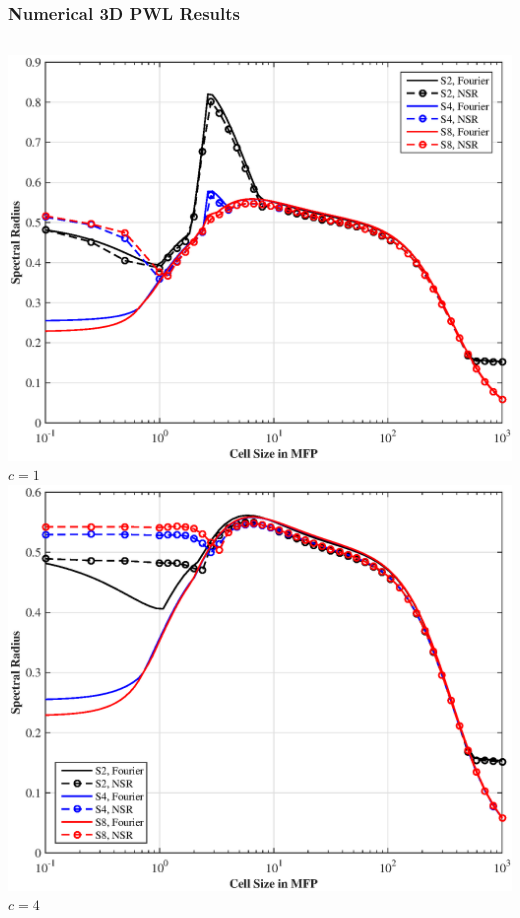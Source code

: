 \documentclass[compress,10pt]{beamer}
\begin{document}
\begin{frame}[t]
{
\frametitle{Numerical 3D PWL Results}
\vspace{1cm}
\begin{columns}
\centering
\includegraphics[width=\textwidth]{images/SI_MIP_hex_C=1_PWLD_LS_wNSR.eps}\\
$c=1$
\centering
\includegraphics[width=\textwidth]{images/SI_MIP_hex_C=4_PWLD_LS_wNSR.eps}\\
$c=4$
\end{columns}
}
\end{frame}
\end{document}
